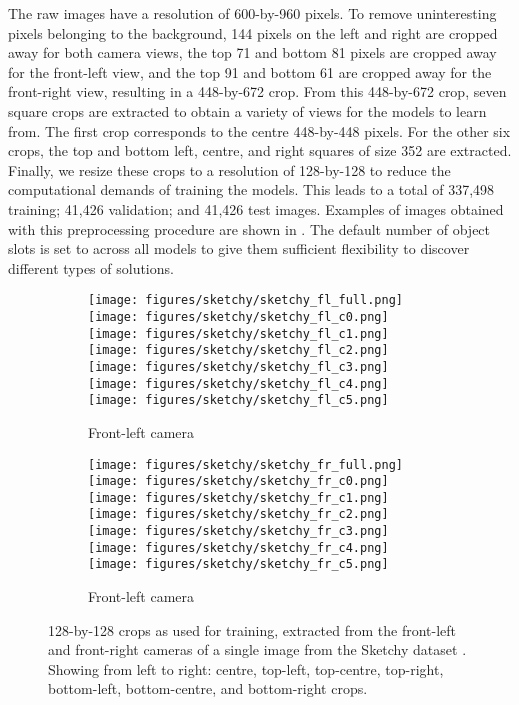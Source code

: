 \documentclass{article}
\begin{document}
The raw images have a resolution of 600-by-960 pixels. To remove uninteresting pixels belonging to the background, 144 pixels on the left and right are cropped away for both camera views, the top 71 and bottom 81 pixels are cropped away for the front-left view, and the top 91 and bottom 61 are cropped away for the front-right view, resulting in a 448-by-672 crop.
From this 448-by-672 crop, seven square crops are extracted to obtain a variety of views for the models to learn from.
The first crop corresponds to the centre 448-by-448 pixels.
For the other six crops, the top and bottom left, centre, and right squares of size 352 are extracted.
Finally, we resize these crops to a resolution of 128-by-128 to reduce the computational demands of training the models.
This leads to a total of 337,498 training; 41,426 validation; and 41,426 test images.
Examples of images obtained with this preprocessing procedure are shown in .
The default number of object slots is set to  across all models to give them sufficient flexibility to discover different types of solutions.

\begin{figure}[h!]
	\centering
	\begin{subfigure}{\linewidth}
		\centering
		\texttt{[image: figures/sketchy/sketchy\_fl\_full.png]}
		\texttt{[image: figures/sketchy/sketchy\_fl\_c0.png]}
		\texttt{[image: figures/sketchy/sketchy\_fl\_c1.png]}
		\texttt{[image: figures/sketchy/sketchy\_fl\_c2.png]}
		\texttt{[image: figures/sketchy/sketchy\_fl\_c3.png]}
		\texttt{[image: figures/sketchy/sketchy\_fl\_c4.png]}
		\texttt{[image: figures/sketchy/sketchy\_fl\_c5.png]}
		\caption{Front-left camera}
	\end{subfigure}
	\par\smallskip
	\begin{subfigure}{\linewidth}
		\centering
		\texttt{[image: figures/sketchy/sketchy\_fr\_full.png]}
		\texttt{[image: figures/sketchy/sketchy\_fr\_c0.png]}
		\texttt{[image: figures/sketchy/sketchy\_fr\_c1.png]}
		\texttt{[image: figures/sketchy/sketchy\_fr\_c2.png]}
		\texttt{[image: figures/sketchy/sketchy\_fr\_c3.png]}
		\texttt{[image: figures/sketchy/sketchy\_fr\_c4.png]}
		\texttt{[image: figures/sketchy/sketchy\_fr\_c5.png]}
		\caption{Front-left camera}
	\end{subfigure}
	\caption{128-by-128 crops as used for training, extracted from the front-left and front-right cameras of a single image from the Sketchy dataset \citep{cabi2019scaling}. Showing from left to right: centre, top-left, top-centre, top-right, bottom-left, bottom-centre, and bottom-right crops.}
	\label{fig:gpp:sketchy:crops}
\end{figure}
\end{document}

